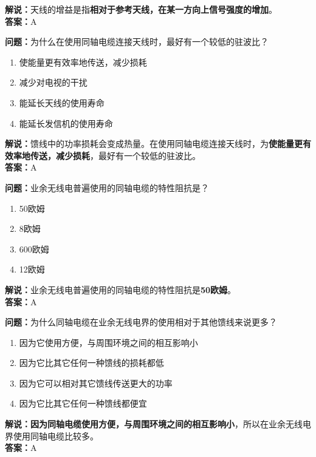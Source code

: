 \textbf{解说：}天线的增益是指\textbf{相对于参考天线，在某一方向上信号强度的增加}。\\\textbf{答案：}A%



\textbf{问题：}为什么在使用同轴电缆连接天线时，最好有一个较低的驻波比？

\begin{enumerate}[label=\Alph*), leftmargin=1cm]
	\item 使能量更有效率地传送，减少损耗
	\item 减少对电视的干扰
	\item 能延长天线的使用寿命
	\item 能延长发信机的使用寿命
\end{enumerate}

\textbf{解说：}馈线中的功率损耗会变成热量。在使用同轴电缆连接天线时，为\textbf{使能量更有效率地传送，减少损耗}，最好有一个较低的驻波比。\\\textbf{答案：}A%



\textbf{问题：}业余无线电普遍使用的同轴电缆的特性阻抗是？

\begin{enumerate}[label=\Alph*), leftmargin=1cm]
	\item 50欧姆
	\item 8欧姆
	\item 600欧姆
	\item 12欧姆
\end{enumerate}

\textbf{解说：}业余无线电普遍使用的同轴电缆的特性阻抗是\textbf{50欧姆}。\\\textbf{答案：}A%



\textbf{问题：}为什么同轴电缆在业余无线电界的使用相对于其他馈线来说更多？

\begin{enumerate}[label=\Alph*), leftmargin=1cm]
	\item 因为它使用方便，与周围环境之间的相互影响小
	\item 因为它比其它任何一种馈线的损耗都低
	\item 因为它可以相对其它馈线传送更大的功率
	\item 因为它比其它任何一种馈线都便宜
\end{enumerate}

\textbf{解说：}\textbf{因为同轴电缆使用方便，与周围环境之间的相互影响小}，所以在业余无线电界使用同轴电缆比较多。\\\textbf{答案：}A%



